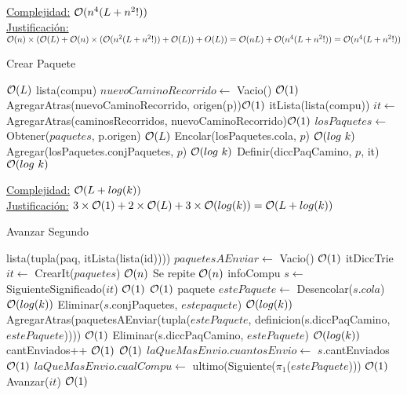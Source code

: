 \begin{Algoritmos}
\begin{algorithm}
\begin{algorithmic}[1]
  \EndProcedure 
\end{algorithmic}
\underline{Complejidad:} $\mathcal{O}(n^4(L + n^2!))$ \\
 \underline{Justificación:} $\mathcal{O}(n)\times(\mathcal{O}(L) + \mathcal{O}(n)\times(\mathcal{O}(n^2 (L+n^2!)) + \mathcal{O}(L)) + O(L)) = \mathcal{O}(nL) + \mathcal{O}(n^4(L + n^2!)) =   \mathcal{O}(n^4(L + n^2!))$
\end{algorithm}


\begin{algorithm}
\caption{Crear Paquete}
\begin{algorithmic}[1]
    \Comment $\mathcal{O}(L)$
   \State lista(compu) $nuevoCaminoRecorrido \gets$ Vacio() \Comment $\mathcal{O}(1)$
   \State AgregarAtras(nuevoCaminoRecorrido, origen(p))\Comment  $\mathcal{O}(1)$
   \State itLista(lista(compu)) $it \gets$ AgregarAtras(caminosRecorridos, nuevoCaminoRecorrido)\Comment $\mathcal{O}(1)$
   \State $losPaquetes \gets $ Obtener($paquetes$, p.origen) \Comment $\mathcal{O}(L)$
   \State Encolar(losPaquetes.cola, $p$) \Comment $\mathcal{O}(log \ k)$
   \State Agregar(losPaquetes.conjPaquetes, $p$) \Comment $\mathcal{O}(log \ k)$
   \State Definir(diccPaqCamino, $p$, it) \Comment $\mathcal{O}(log \ k)$
   \EndIf
   \EndProcedure
\end{algorithmic}
\underline{Complejidad:} $\mathcal{O}(L + log(k))$\\
\underline{Justificación:} $3 \times \mathcal{O}(1)+2 \times \mathcal{O}(L)+3\times \mathcal{O}(log(k)) = \mathcal{O}(L + log(k))$
\end{algorithm}


\begin{algorithm}
\caption{Avanzar Segundo}
\begin{algorithmic}[1]
  
  \State lista(tupla(paq, itLista(lista(id)))) $paquetesAEnviar \gets$ Vacio() \Comment  $\mathcal{O}(1)$
  \State itDiccTrie $it \gets$ CrearIt($paquetes$) \Comment  $\mathcal{O}(n)$
   \Comment Se repite $\mathcal{O}(n)$  
  	\State infoCompu $s \gets$ SiguienteSignificado($it$) \Comment  $\mathcal{O}(1)$ 
  	 \Comment  $\mathcal{O}(1)$
  		\State paquete $estePaquete \gets$ Desencolar($s$.$cola$) \Comment  $\mathcal{O}(log(k))$
  		\State Eliminar($s$.conjPaquetes, $estepaquete$) \Comment  $\mathcal{O}(log(k))$
		\State AgregarAtras(paquetesAEnviar(tupla($estePaquete$, definicion(s.diccPaqCamino, $estePaquete$)))) 
		\State\Comment  $\mathcal{O}(1)$
		\State Eliminar(s.diccPaqCamino, $estePaquete$)  \Comment  $\mathcal{O}(log(k))$
		\State cantEnviados++ \Comment  $\mathcal{O}(1)$
		 \Comment  $\mathcal{O}(1)$
		   \State $laQueMasEnvio.cuantosEnvio \gets$ $s$.cantEnviados \Comment  $\mathcal{O}(1)$
		   \State $laQueMasEnvio.cualCompu \gets$ ultimo(Siguiente($\pi_1$($estePaquete$))) \Comment  $\mathcal{O}(1)$
		\EndIf 
	\EndIf
	\State Avanzar($it$) \Comment  $\mathcal{O}(1)$
  \EndWhile 
   

\end{algorithmic}
\end{algorithm}
\end{Algoritmos}
